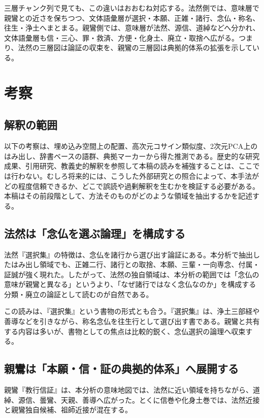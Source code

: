 \documentclass[uplatex,dvipdfmx,11pt,a4paper]{jsarticle}
\begin{document}
三層チャンク列で見ても、この違いはおおむね対応する。法然側では、意味層で親鸞との近さを保ちつつ、文体語彙層が選択・本願、正雑・諸行、念仏・称名、往生・浄土へまとまる。親鸞側では、意味層が法然、源信、道綽などへ分かれ、文体語彙層も信・三心、罪・救済、方便・化身土、廃立・取捨へ広がる。つまり、法然の三層図は論証の収束を、親鸞の三層図は典拠的体系の拡張を示している。

\section{考察}

\subsection{解釈の範囲}

以下の考察は、埋め込み空間上の配置、高次元コサイン類似度、2次元PCA上のはみ出し、辞書ベースの語群、典拠マーカーから得た推測である。歴史的な研究成果、引用研究、教義史的解釈を参照して本稿の読みを補強することは、ここでは行わない。むしろ将来的には、こうした外部研究との照合によって、本手法がどの程度信頼できるか、どこで誤読や過剰解釈を生むかを検証する必要がある。本稿はその前段階として、方法そのものがどのような領域を抽出するかを記述する。

\subsection{法然は「念仏を選ぶ論理」を構成する}

法然『選択集』の特徴は、念仏を諸行から選び出す論証にある。本分析で抽出したはみ出し領域でも、正雑二行、諸行との取捨、本願、三輩・一向専念、付属・証誠が強く現れた。したがって、法然の独自領域は、本分析の範囲では「念仏の意味が親鸞と異なる」というより、「なぜ諸行ではなく念仏なのか」を構成する分類・廃立の論証として読むのが自然である。

この読みは、『選択集』という書物の形式とも合う。『選択集』は、浄土三部経や善導などを引きながら、称名念仏を往生行として選び出す書である。親鸞と共有する内容は多いが、書物としての焦点は比較的鋭く、念仏選択の論理へ収束する。

\subsection{親鸞は「本願・信・証の典拠的体系」へ展開する}

親鸞『教行信証』は、本分析の意味地図では、法然に近い領域を持ちながら、道綽、源信、曇鸞、天親、善導へ広がった。とくに信巻や化身土巻では、法然近接と親鸞独自候補、祖師近接が混在する。
\end{document}
